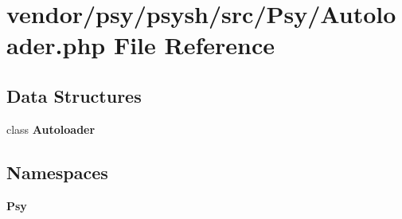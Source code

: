 \section{vendor/psy/psysh/src/\+Psy/\+Autoloader.php File Reference}
\label{psy_2psysh_2src_2_psy_2_autoloader_8php}
\subsection*{Data Structures}
\begin{DoxyCompactItemize}
\item 
class {\bf Autoloader}
\end{DoxyCompactItemize}
\subsection*{Namespaces}
\begin{DoxyCompactItemize}
\item 
 {\bf Psy}
\end{DoxyCompactItemize}
